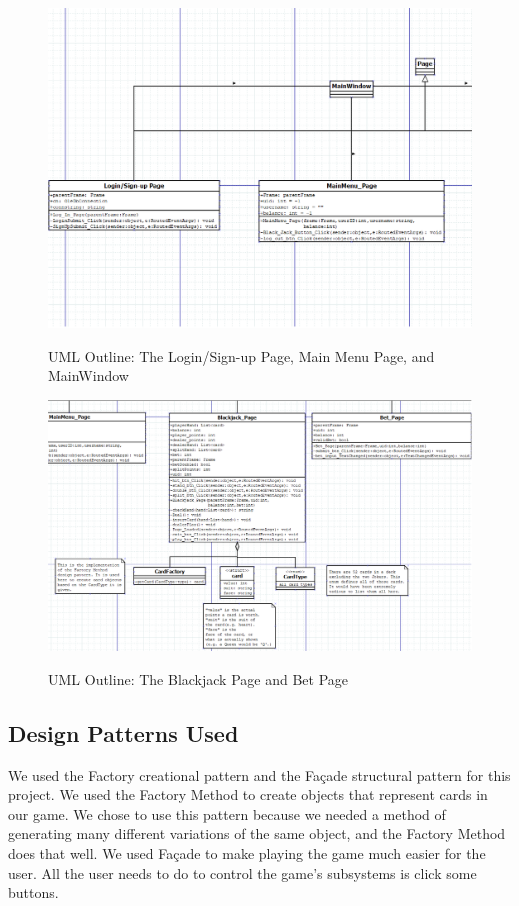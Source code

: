 \documentclass[10pt,conference,onecolumn,compsoc]{IEEEtran}
\begin{document}
\begin{figure}[h]
\caption{UML Outline: The Login/Sign-up Page, Main Menu Page, and MainWindow}
\centering
\includegraphics[scale=0.5]{first_half}
\label{fig:outline1}
\centering
\end{figure}

\begin{figure}[h]
\caption{UML Outline: The Blackjack Page and Bet Page}
\centering
\includegraphics[scale=0.4]{second_half}
\label{fig:outline2}
\centering
\end{figure}



\subsection{Design Patterns Used}
We used the Factory creational pattern and the Façade structural pattern for this project. We used the Factory Method to create objects that represent cards in our game. We chose to use this pattern because we needed a method of generating many different variations of the same object, and the Factory Method does that well. We used Façade to make playing the game much easier for the user. All the user needs to do  to control the game's subsystems is click some buttons.
\end{document}
